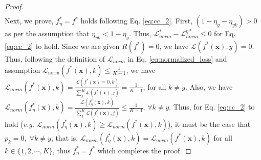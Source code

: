 \documentclass{article}
\def \xx {{\bm{x}}}
\def \L  {\mathcal{L}}
\begin{document}
\begin{proof}
\begin{align}
	\end{align}
	Next, we prove, $f^{\ast}_{\eta}=f^{\ast}$ holds following Eq. \eqref{eq:cc_2}. First, $(1-\eta_{y}-\eta_{y k})>0$ as per the assumption that $\eta_{y k} < 1-\eta_{y}$. Thus, $\L_{norm}^{*} - \L_{norm}^{\eta *} \leq 0$ for Eq. \eqref{eq:cc_2} to hold.
	Since we are given $R(f^*)=0$, we have $\L(f^*(\xx), y) = 0$. 
	Thus, following the definition of $\L_{norm}$ in Eq. \eqref{eq:normalized_loss} and assumption $\L_{\text{norm}}(f^{*}(\xx), k) \leq \frac{1}{K-1}$, we have $\L_{norm}(f^*(\xx),k)= \frac{\L(f^*(\xx)=0, k)}{\sum_{j}^{K}\L(f^*(\xx), j)} = \frac{1}{K-1}$, for all $k\neq y$. Also, we have $\L_{norm}(f_\eta^*(\xx) , k) =\frac{\L(f_\eta^*(\xx),k)}{\sum_{j}^{K}\L(f_\eta^*(\xx), j)} \leq \frac{1}{K-1}$, $\forall k\neq y$. Thus, for Eq. \eqref{eq:cc_2} to hold (\textit{e.g.} $\L_{norm}(f_\eta^*(\xx),k) \geq \L_{norm}(f^*(\xx),k)$), it must be the case that $p_k=0,\;\forall k\neq y$, that is, $\L_{norm}(f_\eta^*(\xx),k) = \L_{norm}(f^*(\xx),k)$ for all $k \in \{1,2, \cdots, K\}$, thus $f^{\ast}_{\eta}=f^{\ast}$ which completes the proof.
\end{proof}
\end{document}

